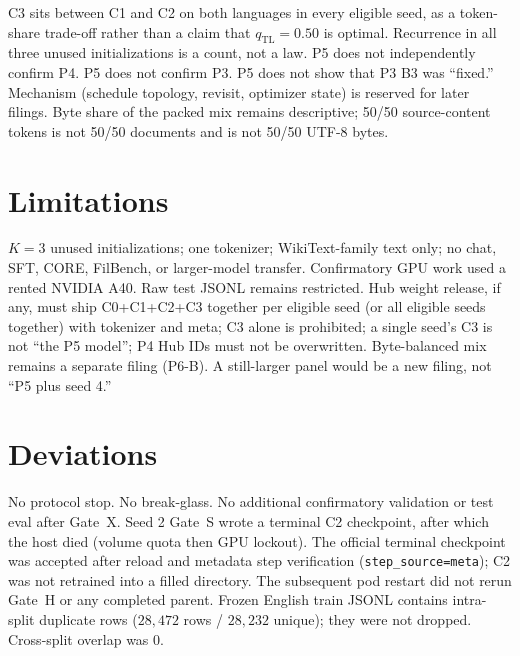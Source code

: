 \documentclass[11pt,a4paper]{article}
\begin{document}
C3 sits between C1 and C2 on both languages in every eligible seed, as a token-share trade-off rather than a claim that $q_{\mathrm{TL}}=0.50$ is optimal. Recurrence in all three unused initializations is a count, not a law. P5 does not independently confirm P4. P5 does not confirm P3. P5 does not show that P3 B3 was ``fixed.'' Mechanism (schedule topology, revisit, optimizer state) is reserved for later filings. Byte share of the packed mix remains descriptive; 50/50 source-content tokens is not 50/50 documents and is not 50/50 UTF-8 bytes.

\section{Limitations}
\label{sec:limit}

$K=3$ unused initializations; one tokenizer; WikiText-family text only; no chat, SFT, CORE, FilBench, or larger-model transfer. Confirmatory GPU work used a rented NVIDIA A40. Raw test JSONL remains restricted. Hub weight release, if any, must ship C0+C1+C2+C3 together per eligible seed (or all eligible seeds together) with tokenizer and meta; C3 alone is prohibited; a single seed's C3 is not ``the P5 model''; P4 Hub IDs must not be overwritten. Byte-balanced mix remains a separate filing (P6-B). A still-larger panel would be a new filing, not ``P5 plus seed 4.''

\section{Deviations}
\label{sec:dev}

No protocol stop. No break-glass. No additional confirmatory validation or test eval after Gate~X. Seed 2 Gate~S wrote a terminal C2 checkpoint, after which the host died (volume quota then GPU lockout). The official terminal checkpoint was accepted after reload and metadata step verification (\texttt{step\_source=meta}); C2 was not retrained into a filled directory. The subsequent pod restart did not rerun Gate~H or any completed parent. Frozen English train JSONL contains intra-split duplicate rows ($28{,}472$ rows / $28{,}232$ unique); they were not dropped. Cross-split overlap was 0.
\end{document}
